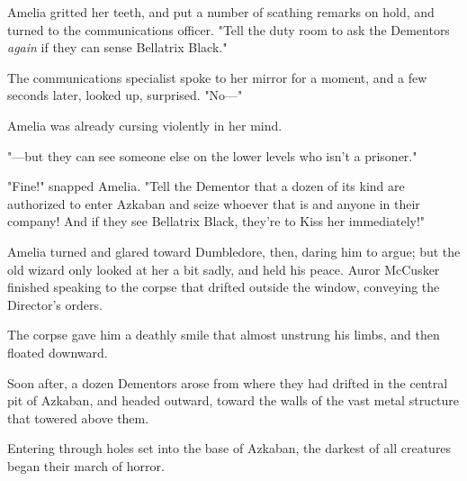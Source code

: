 Amelia gritted her teeth, and put a number of scathing remarks on hold, and 
turned to the communications officer. "Tell the duty room to ask the Dementors 
\emph{again} if they can sense Bellatrix Black."

The communications specialist spoke to her mirror for a moment, and a few 
seconds later, looked up, surprised. "No---"

Amelia was already cursing violently in her mind.

"---but they can see someone else on the lower levels who isn't a prisoner."

"Fine!" snapped Amelia. "Tell the Dementor that a dozen of its kind are 
authorized to enter Azkaban and seize whoever that is and anyone in their 
company! And if they see Bellatrix Black, they're to Kiss her immediately!"

Amelia turned and glared toward Dumbledore, then, daring him to argue; but the 
old wizard only looked at her a bit sadly, and held his peace.
\sbreak
Auror McCusker finished speaking to the corpse that drifted outside the window, 
conveying the Director's orders.

The corpse gave him a deathly smile that almost unstrung his limbs, and then 
floated downward.

Soon after, a dozen Dementors arose from where they had drifted in the central 
pit of Azkaban, and headed outward, toward the walls of the vast metal 
structure that towered above them.

Entering through holes set into the base of Azkaban, the darkest of all 
creatures began their march of horror.
